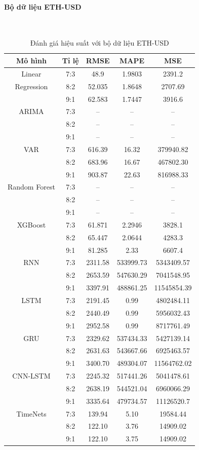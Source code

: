 \documentclass[conference]{IEEEtran}
\begin{document}
\paragraph{\textbf{Bộ dữ liệu ETH-USD}} \mbox{} \\
\begin{table}[H]
 \centering
 \caption{Đánh giá hiệu suất với bộ dữ liệu ETH-USD}
\begin{adjustbox}{width=0.4\textwidth}
\begin{tabular}{|c|c|c|c|c|}
\hline
Mô hình & Tỉ lệ & RMSE & MAPE & MSE \\ \hline
Linear & 7:3 & 48.9 & 1.9803 & 2391.2 \\
Regression & 8:2 & 52.035 & 1.8648 & 2707.69 \\
& 9:1 & 62.583 & 1.7447 & 3916.6 \\ \hline
ARIMA & 7:3 & -- & -- & -- \\
& 8:2 & -- & -- & -- \\
& 9:1 & -- & -- & -- \\ \hline
VAR & 7:3 & 616.39 & 16.32 & 379940.82 \\
& 8:2 & 683.96 & 16.67 & 467802.30 \\
& 9:1 &  903.87 & 22.63 & 816988.33 \\ \hline
Random Forest & 7:3 & -- & -- & -- \\
& 8:2 & -- & -- & -- \\
& 9:1 & -- & -- & -- \\ \hline
XGBoost & 7:3 & 61.871 & 2.2946 & 3828.1 \\
& 8:2 & 65.447 & 2.0644 & 4283.3 \\
& 9:1 & 81.285 & 2.33 & 6607.4 \\ \hline
RNN & 7:3 & 2311.58 & 533999.73 & 5343409.57 \\
& 8:2 & 2653.59 & 547630.29 & 7041548.95 \\
& 9:1 & 3397.91 & 488861.25 & 11545854.39 \\ \hline
LSTM & 7:3 & 2191.45 & 0.99 & 4802484.11 \\
& 8:2 & 2440.49 & 0.99 & 5956032.43 \\
& 9:1 & 2952.58 & 0.99 & 8717761.49 \\ \hline
GRU & 7:3 & 2329.62 & 537434.33 & 5427139.14 \\
& 8:2 & 2631.63 & 543667.66 & 6925463.57 \\
& 9:1 & 3400.70 & 489304.07 & 11564762.02 \\ \hline
CNN-LSTM & 7:3 & 2245.32 & 517441.26 & 5041478.61 \\
& 8:2 & 2638.19 & 544521.04 & 6960066.29 \\
& 9:1 & 3335.64 & 479734.57 & 11126520.7 \\ \hline
TimeNets & 7:3 & 139.94 & 5.10 & 19584.44 \\
& 8:2 & 122.10 & 3.76 & 14909.02 \\
& 9:1 & 122.10 & 3.75 & 14909.02 \\ \hline
\end{tabular}
\end{adjustbox}
\end{table}
\end{document}
